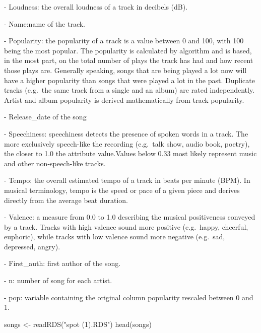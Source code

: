 \documentclass[
]{article}
\newenvironment{Shaded}{\begin{snugshade}}{\end{snugshade}}
\newcommand{\FunctionTok}[1]{\textcolor[rgb]{0.00,0.00,0.00}{#1}}
\newcommand{\NormalTok}[1]{#1}
\newcommand{\OtherTok}[1]{\textcolor[rgb]{0.56,0.35,0.01}{#1}}
\newcommand{\StringTok}[1]{\textcolor[rgb]{0.31,0.60,0.02}{#1}}
\begin{document}
- Loudness: the overall loudness of a track in decibels (dB).

- Name:name of the track.

- Popularity: the popularity of a track is a value between 0 and 100,
with 100 being the most popular. The popularity is calculated by
algorithm and is based, in the most part, on the total number of plays
the track has had and how recent those plays are. Generally speaking,
songs that are being played a lot now will have a higher popularity than
songs that were played a lot in the past. Duplicate tracks (e.g.~the
same track from a single and an album) are rated independently. Artist
and album popularity is derived mathematically from track popularity.

- Release\_date of the song

- Speechiness: speechiness detects the presence of spoken words in a
track. The more exclusively speech-like the recording (e.g.~talk show,
audio book, poetry), the closer to 1.0 the attribute value.Values below
0.33 most likely represent music and other non-speech-like tracks.

- Tempo: the overall estimated tempo of a track in beats per minute
(BPM). In musical terminology, tempo is the speed or pace of a given
piece and derives directly from the average beat duration.

- Valence: a measure from 0.0 to 1.0 describing the musical positiveness
conveyed by a track. Tracks with high valence sound more positive
(e.g.~happy, cheerful, euphoric), while tracks with low valence sound
more negative (e.g.~sad, depressed, angry).

- First\_auth: first author of the song.

- n: number of song for each artist.

- pop: variable containing the original column popularity rescaled
between 0 and 1.

\begin{Shaded}
\begin{Highlighting}[]
\NormalTok{songs }\OtherTok{\textless{}{-}} \FunctionTok{readRDS}\NormalTok{(}\StringTok{"spot (1).RDS"}\NormalTok{)}
\FunctionTok{head}\NormalTok{(songs)}
\end{Highlighting}
\end{Shaded}
\end{document}
